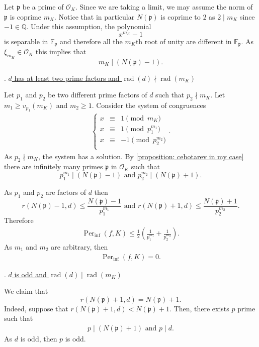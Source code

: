 \documentclass{amsart}
\def\QQ{\mathbb Q}
\def\OK{\mathcal{O}_K}
\def\FF{\mathbb F}
\DeclareMathOperator{\Per}{Per}
\DeclareMathOperator{\rad}{rad}
\theoremstyle{definition}
\begin{document}
Let $\mathfrak{p}$ be a prime of $\OK$. Since we are taking a limit, we may assume the norm of $\mathfrak{p}$ is coprime $m_K$. Notice that in particular $N(\mathfrak{p})$ is coprime to $2$ as $2 \mid m_K$ since $-1 \in \QQ$. Under this assumption, the polynomial $$x^{m_K}-1$$ is separable in $\FF_\mathfrak{p}$ and therefore all the $m_K$th root of unity are different in $\FF_\mathfrak{p}$. As $\xi_{m_K} \in \OK$ this implies that
\begin{equation}
m_K \mid (N(\mathfrak{p})-1).
\label{equation: mK divides N(p)-1}
\end{equation}

\bigskip

. \underline{$d$ has at least two prime factors and $\rad(d) \nmid \rad(m_K)$} 

Let $p_1$ and $p_2$ be two different prime factors of $d$ such that $p_2 \nmid m_K$. Let $m_1 \geq v_{p_1}(m_K)$ and $m_2 \geq 1$. Consider the system of congruences
\begin{align*}
\left \{ \begin{matrix} 
x &\equiv & 1 \pmod{m_K} \\
x &\equiv & 1 \pmod{p_1^{m_1}} \\
x &\equiv & -1 \pmod{p_2^{m_2}} \\
\end{matrix}\right..
\end{align*} 
As $p_2 \nmid m_K$, the system has a solution. By \cref{proposition: cebotarev in my case} there are infinitely many primes $\mathfrak{p}$ in $\OK$ such that 
$$p_1^{m_1} \mid (N(\mathfrak{p})-1) \text{ and } p_2^{m_2} \mid (N(\mathfrak{p})+1).$$

As $p_1$ and $p_2$ are factors of $d$ then 
$$r(N(\mathfrak{p})-1,d) \leq \frac{N(\mathfrak{p})-1}{p_1^{m_1}} \text{ and } r(N(\mathfrak{p})+1,d) \leq \frac{N(\mathfrak{p})+1}{p_2^{m_2}}.$$ Therefore 
\begin{align*}
\Per_{\inf}(f,K) \leq \frac{1}{2} \left( \frac{1}{p_1^{m_1}} + \frac{1}{p_2^{m_2}} \right).
\end{align*}
As $m_1$ and $m_2$ are arbitrary, then 
\begin{align*}
\Per_{\inf}(f,K) = 0.
\end{align*}

\bigskip

. \underline{$d$ is odd and $\rad(d) \mid \rad(m_K)$}

We claim that $$r(N(\mathfrak{p})+1,d) = N(\mathfrak{p})+1.$$ Indeed, suppose that $r(N(\mathfrak{p})+1,d) < N(\mathfrak{p})+1$. Then, there exists $p$ prime such that 
\begin{align*}
p \mid (N(\mathfrak{p})+1) \text{ and } p \mid d.
\end{align*}
As $d$ is odd, then $p$ is odd. 
\end{document}
